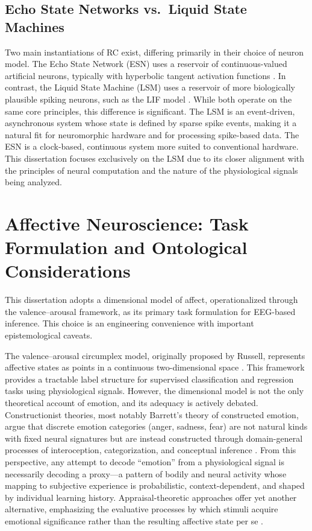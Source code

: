 \subsection{Echo State Networks vs.\ Liquid State Machines}
Two main instantiations of RC exist, differing primarily in their choice of neuron model. The Echo State Network (ESN) uses a reservoir of continuous-valued artificial neurons, typically with hyperbolic tangent activation functions \cite{jaeger2001echo}. In contrast, the Liquid State Machine (LSM) uses a reservoir of more biologically plausible spiking neurons, such as the LIF model \cite{Maass2002RealTime}. While both operate on the same core principles, this difference is significant. The LSM is an event-driven, asynchronous system whose state is defined by sparse spike events, making it a natural fit for neuromorphic hardware and for processing spike-based data. The ESN is a clock-based, continuous system more suited to conventional hardware. This dissertation focuses exclusively on the LSM due to its closer alignment with the principles of neural computation and the nature of the physiological signals being analyzed.


\section{Affective Neuroscience: Task Formulation and Ontological Considerations}
\label{sec:affect_ontology}

This dissertation adopts a dimensional model of affect, operationalized through the valence--arousal framework, as its primary task formulation for EEG-based inference. This choice is an engineering convenience with important epistemological caveats.

The valence--arousal circumplex model, originally proposed by Russell, represents affective states as points in a continuous two-dimensional space \cite{russell_1980}. This framework provides a tractable label structure for supervised classification and regression tasks using physiological signals. However, the dimensional model is not the only theoretical account of emotion, and its adequacy is actively debated. Constructionist theories, most notably Barrett's theory of constructed emotion, argue that discrete emotion categories (anger, sadness, fear) are not natural kinds with fixed neural signatures but are instead constructed through domain-general processes of interoception, categorization, and conceptual inference \cite{barrett_2017}. From this perspective, any attempt to decode ``emotion'' from a physiological signal is necessarily decoding a proxy---a pattern of bodily and neural activity whose mapping to subjective experience is probabilistic, context-dependent, and shaped by individual learning history. Appraisal-theoretic approaches offer yet another alternative, emphasizing the evaluative processes by which stimuli acquire emotional significance rather than the resulting affective state per se \cite{scherer_2009}.

